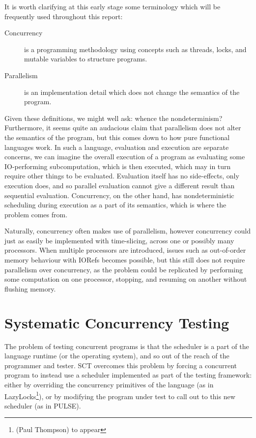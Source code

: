 It is worth clarifying at this early stage some terminology which will
be frequently used throughout this report:

\begin{description}
  \item[Concurrency] is a programming methodology using concepts such
    as threads, locks, and mutable variables to structure
    programs.

  \item[Parallelism] is an implementation detail which does not change
    the semantics of the program.
\end{description}

Given these definitions, we might well ask: whence the nondeterminism?
Furthermore, it seems quite an audacious claim that parallelism does
not alter the semantics of the program, but this comes down to how
pure functional languages work. In such a language, evaluation and
execution are separate concerns, we can imagine the overall execution
of a program as evaluating some IO-performing subcomputation, which is
then executed, which may in turn require other things to be
evaluated. Evaluation itself has no side-effects, only execution does,
and so parallel evaluation cannot give a different result than
sequential evaluation. Concurrency, on the other hand, has
nondeterministic scheduling during execution as a part of its
semantics\cite{parconc}, which is where the problem comes from.

Naturally, concurrency often makes use of parallelism, however
concurrency could just as easily be implemented with time-slicing,
across one or possibly many processors. When multiple processors are
introduced, issues such as out-of-order memory behaviour with
IORefs\cite{ioref} becomes possible, but this still does not require
parallelism over concurrency, as the problem could be replicated by
performing some computation on one processor, stopping, and resuming
on another without flushing memory.

\section{Systematic Concurrency Testing}
\label{sec:intro-sct}

The problem of testing concurrent programs is that the scheduler is a
part of the language runtime (or the operating system), and so out of
the reach of the programmer and tester. SCT overcomes this problem by
forcing a concurrent program to instead use a scheduler implemented as
part of the testing framework: either by overriding the concurrency
primitives of the language (as in LazyLocks\footnote{(Paul Thompson) to
  appear}), or by modifying the program under test to call out to this
new scheduler (as in PULSE\cite{pulse}).

